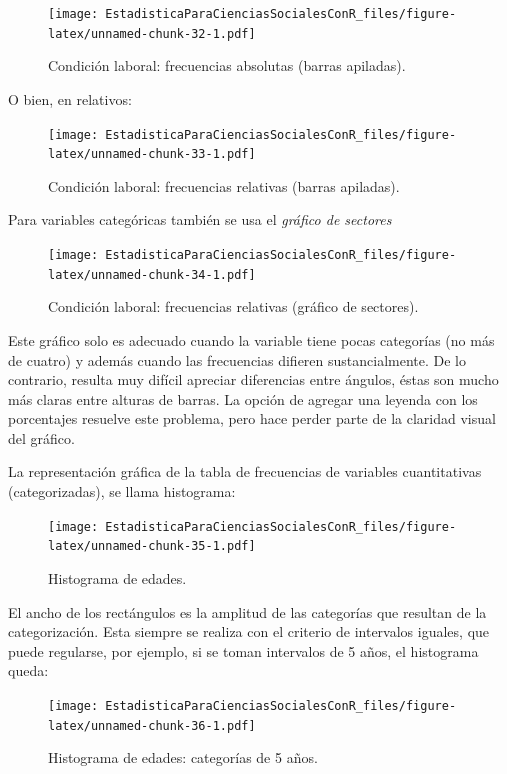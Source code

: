 \documentclass[]{book}
\begin{document}
\begin{figure}
\centering
\texttt{[image: EstadisticaParaCienciasSocialesConR\_files/figure-latex/unnamed-chunk-32-1.pdf]}
\caption{\label{fig:unnamed-chunk-32}Condición laboral: frecuencias absolutas (barras apiladas).}
\end{figure}

O bien, en relativos:

\begin{figure}
\centering
\texttt{[image: EstadisticaParaCienciasSocialesConR\_files/figure-latex/unnamed-chunk-33-1.pdf]}
\caption{\label{fig:unnamed-chunk-33}Condición laboral: frecuencias relativas (barras apiladas).}
\end{figure}

Para variables categóricas también se usa el \emph{gráfico de sectores}

\begin{figure}
\centering
\texttt{[image: EstadisticaParaCienciasSocialesConR\_files/figure-latex/unnamed-chunk-34-1.pdf]}
\caption{\label{fig:unnamed-chunk-34}Condición laboral: frecuencias relativas (gráfico de sectores).}
\end{figure}

Este gráfico solo es adecuado cuando la variable tiene pocas categorías (no más de cuatro) y además cuando las frecuencias difieren sustancialmente. De lo contrario, resulta muy difícil apreciar diferencias entre ángulos, éstas son mucho más claras entre alturas de barras. La opción de agregar una leyenda con los porcentajes resuelve este problema, pero hace perder parte de la claridad visual del gráfico.

La representación gráfica de la tabla de frecuencias de variables cuantitativas (categorizadas), se llama histograma:

\begin{figure}
\centering
\texttt{[image: EstadisticaParaCienciasSocialesConR\_files/figure-latex/unnamed-chunk-35-1.pdf]}
\caption{\label{fig:unnamed-chunk-35}Histograma de edades.}
\end{figure}

El ancho de los rectángulos es la amplitud de las categorías que resultan de la categorización. Esta siempre se realiza con el criterio de intervalos iguales, que puede regularse, por ejemplo, si se toman intervalos de 5 años, el histograma queda:

\begin{figure}
\centering
\texttt{[image: EstadisticaParaCienciasSocialesConR\_files/figure-latex/unnamed-chunk-36-1.pdf]}
\caption{\label{fig:unnamed-chunk-36}Histograma de edades: categorías de 5 años.}
\end{figure}
\end{document}
